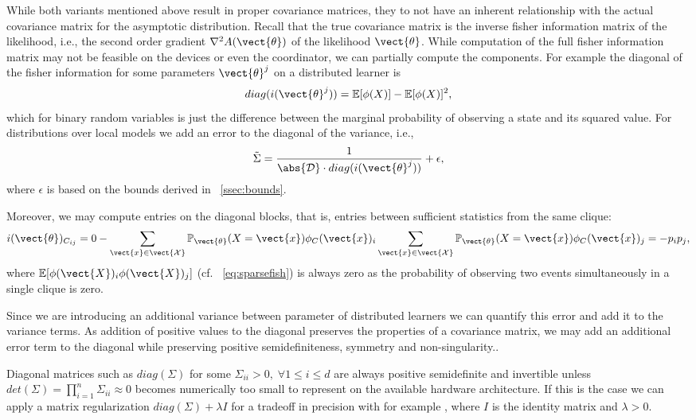 While both variants mentioned above result in proper covariance matrices, they to not have an inherent relationship with the actual covariance matrix for the asymptotic distribution.
Recall that the true covariance matrix is the inverse fisher information matrix of the likelihood, i.e., the second order gradient $\nabla^2 A(\vect{\theta})$ of the likelihood \wrt $\vect{\theta}$.
While computation of the full fisher information matrix may not be feasible on the devices or even the coordinator, we can partially compute the components. 
For example the diagonal of the fisher information for some parameters $\vect{\theta}^j$ on a distributed learner is 
\begin{equation}
    diag(i(\vect{\theta}^j)) = \mathbb{E}[\phi(X)] - \mathbb{E}[\phi(X)]^2,
\end{equation}
which for binary random variables is just the difference between the marginal probability of observing a state and its squared value.
For distributions over local models we add an error to the diagonal of the variance, i.e.,
\begin{equation}
    \tilde{\Sigma}=  \frac{1}{\abs{\mathcal{D}} \cdot diag(i(\vect{\theta}^j))} + \epsilon,
\end{equation}
where $\epsilon$ is based on the bounds derived in \sect~\ref{ssec:bounds}.

Moreover, we may compute entries on the diagonal blocks, that is, entries between sufficient statistics from the same clique:
\begin{equation}
    i(\vect{\theta})_{C_{ij}} = 0- \sum_{\vect{x} \in \vect{\mathcal{X}}} \mathbb{P}_{\vect{\theta}}(X= \vect{x}) \phi_C(\vect{x})_i \sum_{\vect{x} \in \vect{\mathcal{X}}} \mathbb{P}_{\vect{\theta}}(X= \vect{x}) \phi_C(\vect{x})_j= - p_i p_j,
\end{equation}
where $ \mathbb{E}[\phi(\vect{X})_i \phi(\vect{X})_j]$ (cf. \eq~\ref{eq:sparsefish}) is always zero as the probability of observing two events simultaneously in a single clique is zero.

Since we are introducing an additional variance between parameter of distributed learners we can quantify this error and add it to the variance terms.
As addition of positive values to the diagonal preserves the properties of a covariance matrix, we may add an additional error term to the diagonal while preserving positive semidefiniteness, symmetry and non-singularity..

Diagonal matrices such as $diag(\Sigma)$ for some $\Sigma_{ii} > 0, \; \forall 1 \leq i \leq d$ are always positive semidefinite and invertible unless $det(\Sigma) = \prod_{i=1}^n \Sigma_{ii} \approx 0$ becomes numerically too small to represent on the available hardware architecture. 
If this is the case we can apply a matrix regularization $diag(\Sigma) + \lambda I$ for a tradeoff in precision with for example , where $I$ is the identity matrix and $\lambda > 0$.

